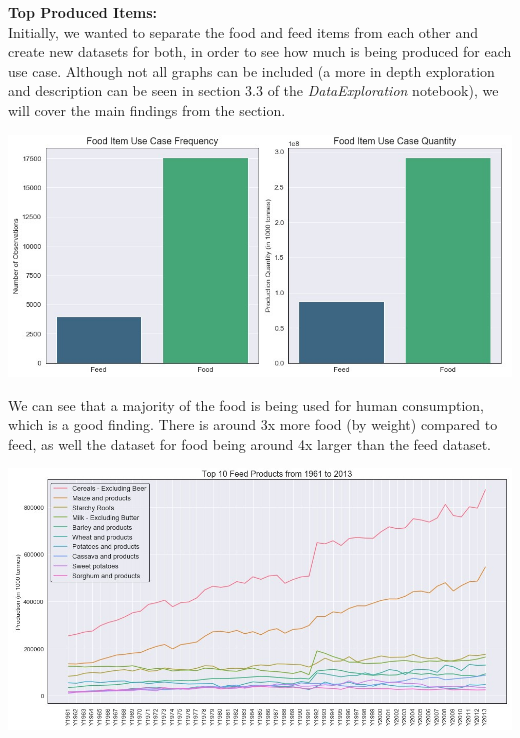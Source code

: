 \documentclass[12pt, a4paper]{article}
\begin{document}
\begin{spacing}{1.1}

	\noindent \textbf{Top Produced Items:}\\
	Initially, we wanted to separate the food and feed items from each other and create new datasets for both, in order to see how much is being produced for each use case. Although not all graphs can be included (a more in depth exploration and description can be seen in section 3.3 of the \textit{DataExploration} notebook), we will cover the main findings from the section.
	\begin{center}
	\includegraphics[scale=.65]{food_feed} 
	\end{center}
	We can see that a majority of the food is being used for human consumption, which is a good finding. There is around 3x more food (by weight) compared to feed, as well the dataset for food being around 4x larger than the feed dataset. 
	\begin{center}
	\includegraphics[scale=.6]{yearly_feed} 
	\end{center} \newpage



\end{spacing}
\end{document}
